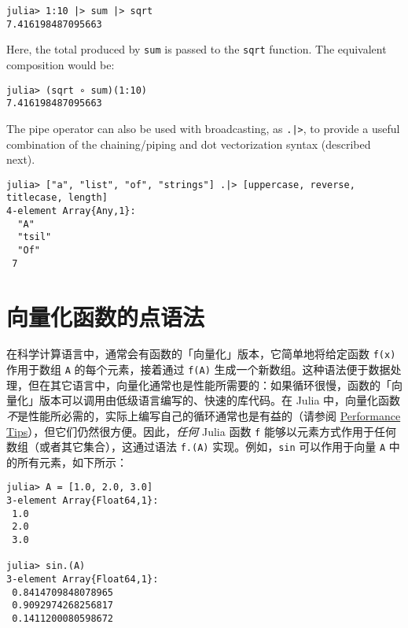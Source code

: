 \begin{verbatim}
julia> 1:10 |> sum |> sqrt
7.416198487095663
\end{verbatim}



Here, the total produced by \texttt{sum} is passed to the \texttt{sqrt} function. The equivalent composition would be:




\begin{verbatim}
julia> (sqrt ∘ sum)(1:10)
7.416198487095663
\end{verbatim}



The pipe operator can also be used with broadcasting, as \texttt{.|>}, to provide a useful combination of the chaining/piping and dot vectorization syntax (described next).




\begin{verbatim}
julia> ["a", "list", "of", "strings"] .|> [uppercase, reverse, titlecase, length]
4-element Array{Any,1}:
  "A"
  "tsil"
  "Of"
 7
\end{verbatim}



\hypertarget{13590013989415065742}{}


\section{向量化函数的点语法}



在科学计算语言中，通常会有函数的「向量化」版本，它简单地将给定函数 \texttt{f(x)} 作用于数组 \texttt{A} 的每个元素，接着通过 \texttt{f(A)} 生成一个新数组。这种语法便于数据处理，但在其它语言中，向量化通常也是性能所需要的：如果循环很慢，函数的「向量化」版本可以调用由低级语言编写的、快速的库代码。在 Julia 中，向量化函数\emph{不}是性能所必需的，实际上编写自己的循环通常也是有益的（请参阅 \hyperlink{818954303942149020}{Performance Tips}），但它们仍然很方便。因此，\emph{任何} Julia 函数 \texttt{f} 能够以元素方式作用于任何数组（或者其它集合），这通过语法 \texttt{f.(A)} 实现。例如，\texttt{sin} 可以作用于向量 \texttt{A} 中的所有元素，如下所示：




\begin{verbatim}
julia> A = [1.0, 2.0, 3.0]
3-element Array{Float64,1}:
 1.0
 2.0
 3.0

julia> sin.(A)
3-element Array{Float64,1}:
 0.8414709848078965
 0.9092974268256817
 0.1411200080598672
\end{verbatim}




